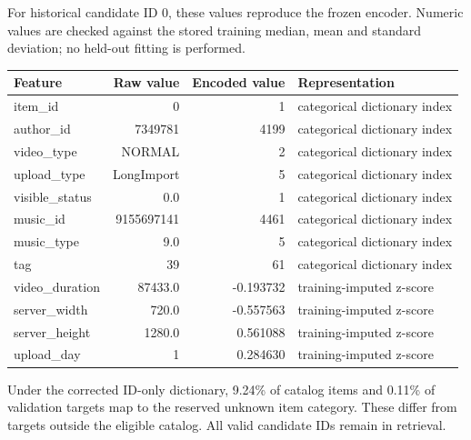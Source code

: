 \documentclass[11pt,a4paper]{article}
\begin{document}
For historical candidate ID 0, these values reproduce the frozen encoder. Numeric values are checked against the stored training median, mean and standard deviation; no held-out fitting is performed.

\begin{center}\small\begin{tabularx}{\linewidth}{lrrX}\toprule Feature & Raw value & Encoded value & Representation\\\midrule
item\_id & 0 & 1 & categorical dictionary index \\
author\_id & 7349781 & 4199 & categorical dictionary index \\
video\_type & NORMAL & 2 & categorical dictionary index \\
upload\_type & LongImport & 5 & categorical dictionary index \\
visible\_status & 0.0 & 1 & categorical dictionary index \\
music\_id & 9155697141 & 4461 & categorical dictionary index \\
music\_type & 9.0 & 5 & categorical dictionary index \\
tag & 39 & 61 & categorical dictionary index \\
video\_duration & 87433.0 & -0.193732 & training-imputed z-score \\
server\_width & 720.0 & -0.557563 & training-imputed z-score \\
server\_height & 1280.0 & 0.561088 & training-imputed z-score \\
upload\_day & 1 & 0.284630 & training-imputed z-score \\\bottomrule\end{tabularx}\end{center}

Under the corrected ID-only dictionary, 9.24\% of catalog items and 0.11\% of validation targets map to the reserved unknown item category. These differ from targets outside the eligible catalog. All valid candidate IDs remain in retrieval.
\end{document}
